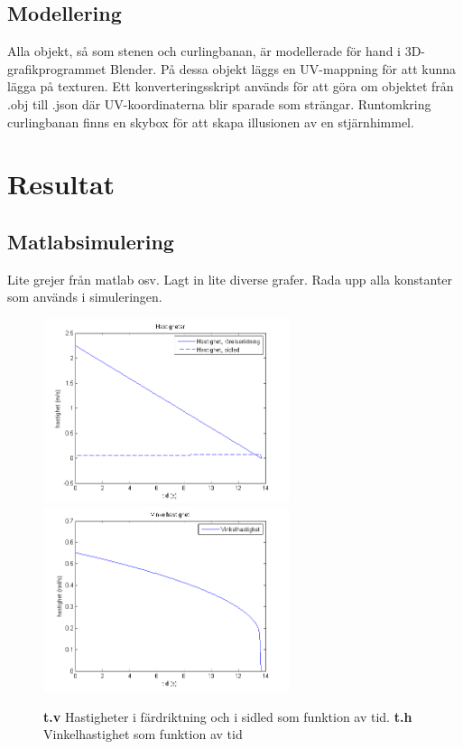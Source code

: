 \documentclass[11pt]{article} %
\begin{document}
\subsection{Modellering}
Alla objekt, så som stenen och curlingbanan, är modellerade för hand i 3D-grafikprogrammet Blender. På dessa objekt läggs en UV-mappning för att kunna lägga på texturen. Ett konverteringsskript används för att göra om objektet från .obj till .json där UV-koordinaterna blir sparade som strängar. Runtomkring curlingbanan finns en skybox för att skapa illusionen av en stjärnhimmel.

\section{Resultat}
\subsection{Matlabsimulering}

Lite grejer från matlab osv. 
Lagt in lite diverse grafer.
Rada upp alla konstanter som används i simuleringen. 

\begin{figure}[ht!]
\centering
\includegraphics[width=72mm]{hastigheter_tid_graf.png}
\includegraphics[width=72mm]{vinkelhastighet_tid_graf.png}
\caption{\textbf{t.v} Hastigheter i färdriktning och i sidled som funktion av tid. \textbf{t.h} Vinkelhastighet som funktion av tid}
\label{fig:hast_and_vinkel_graf}
\label{overflow}
\end{figure}
\end{document}

